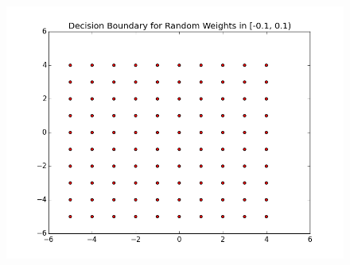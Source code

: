 \documentclass[12pt]{article}
\begin{document}
\begin{enumerate}
\begin{enumerate}
\begin{figure}[H]
          \includegraphics[width=\linewidth]{neg_01_01.png}
        \end{figure}
    \end{enumerate}


\end{enumerate}
\end{document}
